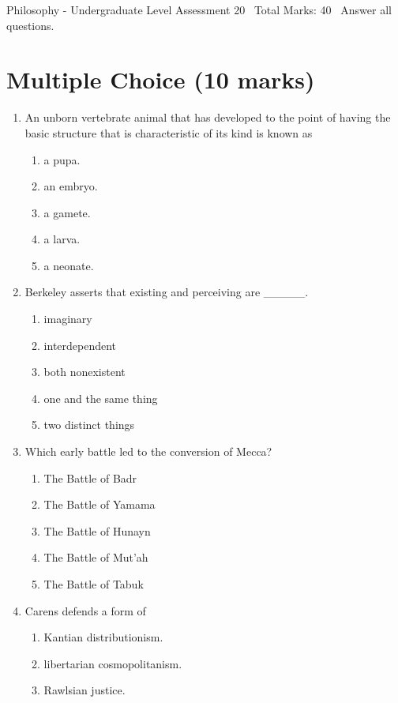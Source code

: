 \documentclass[12pt]{article}
\begin{document}
\begin{center}
Philosophy - Undergraduate Level Assessment 20 \
Total Marks: 40 \
Answer all questions.
\end{center}

\section*{Multiple Choice (10 marks)}
\begin{enumerate}[label=\arabic*.]
\item An unborn vertebrate animal that has developed to the point of having the basic structure that is characteristic of its kind is known as
\begin{enumerate}[label=(\alph*)]
    \item a pupa.
    \item an embryo.
    \item a gamete.
    \item a larva.
    \item a neonate.
\end{enumerate}
\item Berkeley asserts that existing and perceiving are \_\_\_\_\_.
\begin{enumerate}[label=(\alph*)]
    \item imaginary
    \item interdependent
    \item both nonexistent
    \item one and the same thing
    \item two distinct things
\end{enumerate}
\item Which early battle led to the conversion of Mecca?
\begin{enumerate}[label=(\alph*)]
    \item The Battle of Badr
    \item The Battle of Yamama
    \item The Battle of Hunayn
    \item The Battle of Mut'ah
    \item The Battle of Tabuk
\end{enumerate}
\item Carens defends a form of
\begin{enumerate}[label=(\alph*)]
    \item Kantian distributionism.
    \item libertarian cosmopolitanism.
    \item Rawlsian justice.

\end{enumerate}
\end{enumerate}
\end{document}

